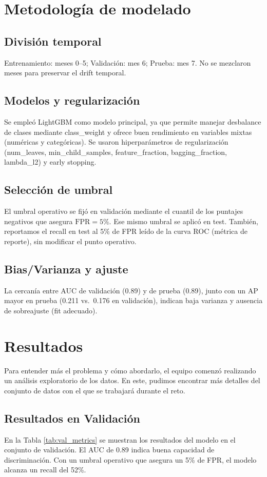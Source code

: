 \documentclass[runningheads]{llncs}
\begin{document}
\section{Metodología de modelado}

\subsection{División temporal}
Entrenamiento: meses 0--5; Validación: mes 6; Prueba: mes 7. 
No se mezclaron meses para preservar el drift temporal.

\subsection{Modelos y regularización}
Se empleó LightGBM como modelo principal, ya que permite manejar desbalance de clases 
mediante class\_weight y ofrece buen rendimiento en variables mixtas 
(numéricas y categóricas). Se usaron hiperparámetros de regularización 
(num\_leaves, min\_child\_samples, feature\_fraction, 
bagging\_fraction, lambda\_l2) y early stopping.

\subsection{Selección de umbral}
El umbral operativo se fijó en validación mediante el cuantil de los puntajes negativos que asegura \(\mathrm{FPR}=5\%\). Ese mismo umbral se aplicó en test. También, reportamos el recall en test al 5\% de FPR leído de la curva ROC (métrica de reporte), sin modificar el punto operativo.

\subsection{Bias/Varianza y ajuste}
La cercanía entre AUC de validación (0.89) y de prueba (0.89), junto con un AP mayor en prueba (0.211 vs.\ 0.176 en validación),
indican baja varianza y ausencia de sobreajuste (fit adecuado).


\section{Resultados}
Para entender más el problema y cómo abordarlo, el equipo comenzó realizando un análisis exploratorio de los datos. En este, pudimos encontrar más detalles del conjunto de datos con el que se trabajará durante el reto.

\subsection{Resultados en Validación}
En la Tabla \ref{tab:val_metrics} se muestran los resultados del modelo en el conjunto de validación. 
El AUC de 0.89 indica buena capacidad de discriminación. 
Con un umbral operativo que asegura un 5\% de FPR, el modelo alcanza un recall del 52\%.
\end{document}
